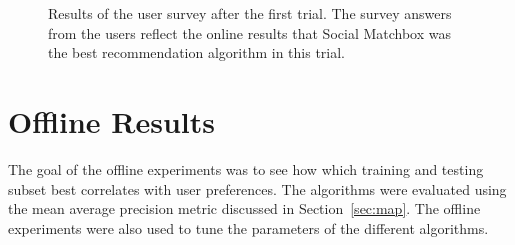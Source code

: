 \begin{figure}[t!]
\caption{Results of the user survey after the first trial. The survey answers from the users reflect the online results that Social Matchbox was the best recommendation algorithm in this trial.}
\label{fig:survey1}
\end{figure}

\section {Offline Results}

The goal of the offline experiments was to see how which training and testing subset best correlates with user preferences. The algorithms were evaluated using the mean average precision metric discussed in Section~\ref{sec:map}. The offline experiments were also used to tune the parameters of the different algorithms. 

